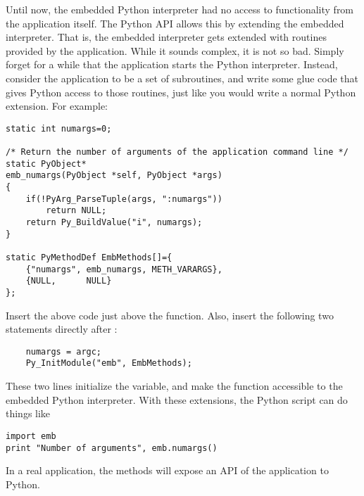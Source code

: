 Until now, the embedded Python interpreter had no access to
functionality from the application itself.  The Python API allows this
by extending the embedded interpreter.  That is, the embedded
interpreter gets extended with routines provided by the application.
While it sounds complex, it is not so bad.  Simply forget for a while
that the application starts the Python interpreter.  Instead, consider
the application to be a set of subroutines, and write some glue code
that gives Python access to those routines, just like you would write
a normal Python extension.  For example:

\begin{verbatim}
static int numargs=0;

/* Return the number of arguments of the application command line */
static PyObject*
emb_numargs(PyObject *self, PyObject *args)
{
    if(!PyArg_ParseTuple(args, ":numargs"))
        return NULL;
    return Py_BuildValue("i", numargs);
}

static PyMethodDef EmbMethods[]={
    {"numargs", emb_numargs, METH_VARARGS},
    {NULL,      NULL}
};
\end{verbatim}

Insert the above code just above the  function.
Also, insert the following two statements directly after
:

\begin{verbatim}
    numargs = argc;
    Py_InitModule("emb", EmbMethods);
\end{verbatim}

These two lines initialize the  variable, and make the
 function accessible to the embedded Python
interpreter.  With these extensions, the Python script can do things
like

\begin{verbatim}
import emb
print "Number of arguments", emb.numargs()
\end{verbatim}

In a real application, the methods will expose an API of the
application to Python.


%


